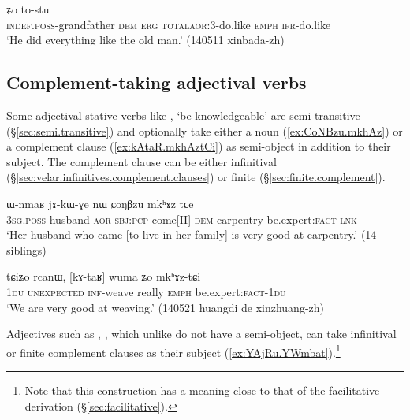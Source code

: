 \begin{exe}
\ex \label{ex:tWtastu.tostu2}
 ʑo to-stu \\
\textsc{indef}.\textsc{poss}-grandfather \textsc{dem} \textsc{erg} \textsc{total}\redp{}\textsc{aor}:3\flobv{}-do.like \textsc{emph} \textsc{ifr}-do.like  \\
\glt `He did everything like the old man.' (140511 xinbada-zh)
\end{exe}

\subsection{Complement-taking adjectival verbs} \label{sec:adjective.complement}
Some adjectival stative verbs like , `be knowledgeable' are semi-transitive (§\ref{sec:semi.transitive}) and optionally take either a noun (\ref{ex:CoNBzu.mkhAz}) or a complement clause (\ref{ex:kAtaR.mkhAztCi}) as semi-object in addition to their subject. The complement clause can be either infinitival (§\ref{sec:velar.infinitives.complement.clauses}) or finite (§\ref{sec:finite.complement}).


\begin{exe}
\ex \label{ex:CoNBzu.mkhAz}
\gll ɯ-nmaʁ jɤ-kɯ-ɣe nɯ ɕoŋβzu mkʰɤz tɕe \\
\textsc{3sg}.\textsc{poss}-husband \textsc{aor}-\textsc{sbj}:\textsc{pcp}-come[II] \textsc{dem} carpentry be.expert:\textsc{fact} \textsc{lnk} \\
\glt `Her husband who came [to live in her family] is very good at carpentry.' (14-siblings)
\end{exe}

\begin{exe}
\ex \label{ex:kAtaR.mkhAztCi}
\gll tɕiʑo rcanɯ, [kɤ-taʁ] wuma ʑo mkʰɤz-tɕi 	 \\
\textsc{1du}  \textsc{unexpected} \textsc{inf}-weave really \textsc{emph} be.expert:\textsc{fact}-\textsc{1du} \\
\glt `We are very good at weaving.' (140521 huangdi de xinzhuang-zh)
\end{exe}


Adjectives such as , , which unlike  do not have a semi-object, can take infinitival or finite complement clauses as their subject (\ref{ex:YAjRu.YWmbat}).\footnote{Note that this construction has a meaning close to that of the facilitative  derivation (§\ref{sec:facilitative}). }

